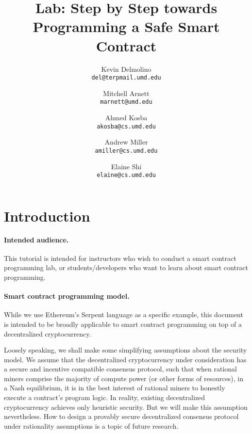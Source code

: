 \documentclass[12pt]{article}
\begin{document}
\title{Lab: Step by Step towards Programming a Safe Smart Contract}

\author{
  Kevin Delmolino\\
  \texttt{del@terpmail.umd.edu}
  \and
  Mitchell Arnett\\
  \texttt{marnett@umd.edu}
  \and
  Ahmed Kosba\\
  \texttt{akosba@cs.umd.edu}
  \and
  Andrew Miller\\
  \texttt{amiller@cs.umd.edu}
  \and
  Elaine Shi\\
  \texttt{elaine@cs.umd.edu}
}

\maketitle

\setcounter{tocdepth}{5}
\tableofcontents

\newpage
\section{Introduction}

\paragraph{Intended audience.}
This tutorial is intended for instructors
who wish to conduct a smart  
contract programming lab, or students/developers
who want to learn about smart contract programming.


\paragraph{Smart contract programming model.}
While we use Ethereum's Serpent language as a specific example,
this document is 
intended to be broadly applicable to 
smart contract programming on top of a decentralized cryptocurrency.

Loosely speaking, we shall make some simplifying assumptions 
about the security model. 
We assume that the decentralized
cryptocurrency under consideration has a secure and incentive compatible
consensus protocol, such that when
rational miners comprise the majority of compute
power (or other forms of resources),
in a Nash equilibrium, it is in the best interest
of rational miners to honestly execute a
contract's program logic.
In reality, existing decentralized cryptocurrency
achieves only heuristic security. But we will make this assumption
nevertheless. How to design a provably  
secure decentralized consensus protocol under
rationality assumptions is a topic of 
future research.
\end{document}
